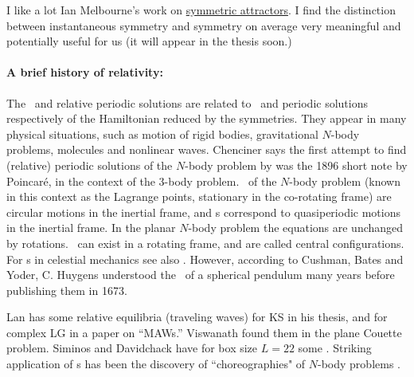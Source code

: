 {%

I like a lot Ian Melbourne's work on
 \href{http://personal.maths.surrey.ac.uk/st/I.Melbourne/symmetric_attractors.html}
 {symmetric attractors}.
I find the distinction between instantaneous symmetry and symmetry
on average very meaningful and potentially useful for us (it will appear
in the thesis soon.)
    } %

\paragraph{A brief history of relativity:}\label{cont:rpoCond}
The \reqva\ and relative periodic solutions
are related to
\eqva\ and periodic solutions respectively
of the Hamiltonian reduced by the symmetries.
They appear in many physical situations,
such as motion of rigid bodies, gravitational
$N$-body problems, molecules and nonlinear waves.
Chenciner says
the first attempt to find (relative) periodic solutions of the
$N$-body problem by
was the 1896 short note by Poincar\'e,
in the context of the 3-body problem.
\Reqva\ of the $N$-body problem
(known in this context as the Lagrange points, stationary in
the co-rotating frame) are circular motions in the inertial frame,
and {\rpo s} correspond to quasiperiodic motions in the inertial frame.
In the planar $N$-body problem the equations are unchanged by
rotations. \Reqva\ can exist in a rotating frame,
and are called central configurations.
For \rpo s in celestial mechanics see also .
However, according to
Cushman, Bates and Yoder,
C. Huygens understood the \reqva\ of a
spherical pendulum many
years before publishing them in 1673.

Lan has some relative equilibria (traveling waves) for KS in his
thesis, %
 and for complex LG in a paper on ``MAWs.''
Viswanath %
found them in the plane Couette problem.
Siminos and Davidchack have for box size $L=22$ some \eqva.
Striking application of \rpo s has been the discovery
of ``choreographies" of $N$-body problems%
.
